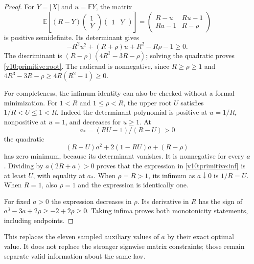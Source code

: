 \documentclass[11pt,a4paper]{article}
\newcommand{\E}{\mathbb E}
\begin{document}
\begin{proof}
For $Y=|X|$ and $u=\E Y$, the matrix
\[
 \E\left[(R-Y)\begin{pmatrix}1\\Y\end{pmatrix}
                     \begin{pmatrix}1&Y\end{pmatrix}\right]
 =\begin{pmatrix}R-u&Ru-1\\Ru-1&R-\rho\end{pmatrix}
\]
is positive semidefinite. Its determinant gives
\[
 -R^2u^2+(R+\rho)u+R^2-R\rho-1\ge0.
\]
The discriminant is $(R-\rho)(4R^3-3R-\rho)$; solving the quadratic
proves \eqref{v10:primitive:root}. The radicand is nonnegative, since
$R\ge\rho\ge1$ and $4R^3-3R-\rho\ge4R(R^2-1)\ge0$.

For completeness, the infimum identity can also be checked without a
formal minimization. For $1< R$ and $1\le\rho<R$, the upper root $U$
satisfies $1/R<U\le1<R$. Indeed the determinant polynomial is positive
at $u=1/R$, nonpositive at $u=1$, and decreases for $u\ge1$.
At
\[
 a_*=(RU-1)/(R-U)>0
\]
the quadratic
\[
 (R-U)a^2+2(1-RU)a+(R-\rho)
\]
has zero minimum, because its determinant vanishes. It is nonnegative
for every $a$. Dividing by $a(2R+a)>0$ proves that the expression in
\eqref{v10:primitive:inf} is at least $U$, with equality at $a_*$.
When $\rho=R>1$, its infimum as $a\downarrow0$ is $1/R=U$.
When $R=1$, also $\rho=1$ and the expression is identically one.

For fixed $a>0$ the expression decreases in $\rho$. Its derivative
in $R$ has the sign of
$a^3-3a+2\rho\ge-2+2\rho\ge0$.
Taking infima proves both monotonicity statements, including endpoints.
\end{proof}

This replaces the eleven sampled auxiliary values of $a$ by their exact
optimal value. It does not replace the stronger signwise matrix constraints;
those remain separate valid information about the same law.
\end{document}
